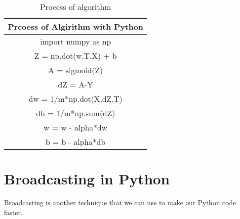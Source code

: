 \documentclass[a4paper]{article}
\begin{document}
\begin{table}[tp]
	\centering
	\begin{tabular}{c}
		\hline
		\textbf{Prcoess of Algirithm with Python}\\
		\hline
		import numpy as np\\
		Z = np.dot(w.T,X) + b\\
		A = sigmoid(Z)\\
		dZ = A-Y\\
		dw = 1/m*np.dot(X,dZ.T)\\
		db = 1/m*np.sum(dZ)\\
		w = w - alpha*dw\\
		b = b - alpha*db\\
		\hline
	\end{tabular}
\caption{Process of algorithm}
\label{tb1}
\end{table}
\section{Broadcasting in Python}
Broadcasting is another technique that we can use to
make our Python code faster.

%



\end{document}
